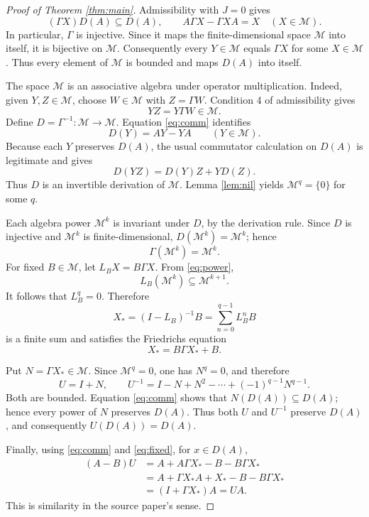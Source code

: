 \documentclass[11pt]{article}
\begin{document}
\begin{proof}[Proof of Theorem \ref{thm:main}]
Admissibility with \(J=0\) gives
\begin{equation}\label{eq:comm}
  (\Gamma X)D(A)\subseteq D(A),
  \qquad
  A\Gamma X-\Gamma XA=X
  \quad(X\in\mathcal M).
\end{equation}
In particular, \(\Gamma\) is injective.  Since it maps the finite-dimensional
space \(\mathcal M\) into itself, it is bijective on \(\mathcal M\).
Consequently every \(Y\in\mathcal M\) equals \(\Gamma X\) for some
\(X\in\mathcal M\).  Thus every element of \(\mathcal M\) is bounded and
maps \(D(A)\) into itself.

The space \(\mathcal M\) is an associative algebra under operator
multiplication.  Indeed, given \(Y,Z\in\mathcal M\), choose
\(W\in\mathcal M\) with \(Z=\Gamma W\).  Condition 4 of admissibility gives
\[
  YZ=Y\Gamma W\in\mathcal M.
\]
Define \(D=\Gamma^{-1}:\mathcal M\to\mathcal M\).  Equation
\eqref{eq:comm} identifies
\[
  D(Y)=AY-YA
  \qquad(Y\in\mathcal M).
\]
Because each \(Y\) preserves \(D(A)\), the usual commutator calculation on
\(D(A)\) is legitimate and gives
\[
  D(YZ)=D(Y)Z+YD(Z).
\]
Thus \(D\) is an invertible derivation of \(\mathcal M\).  Lemma
\ref{lem:nil} yields \(\mathcal M^q=\{0\}\) for some \(q\).

Each algebra power \(\mathcal M^k\) is invariant under \(D\), by the
derivation rule.  Since \(D\) is injective and \(\mathcal M^k\) is
finite-dimensional, \(D(\mathcal M^k)=\mathcal M^k\); hence
\begin{equation}\label{eq:power}
  \Gamma(\mathcal M^k)=\mathcal M^k.
\end{equation}
For fixed \(B\in\mathcal M\), let \(L_BX=B\Gamma X\).  From
\eqref{eq:power},
\[
  L_B(\mathcal M^k)\subseteq\mathcal M^{k+1}.
\]
It follows that \(L_B^q=0\).  Therefore
\[
  X_*=(I-L_B)^{-1}B=\sum_{n=0}^{q-1}L_B^nB
\]
is a finite sum and satisfies the Friedrichs equation
\begin{equation}\label{eq:fixed}
  X_*=B\Gamma X_*+B.
\end{equation}

Put \(N=\Gamma X_*\in\mathcal M\).  Since \(\mathcal M^q=0\), one has
\(N^q=0\), and therefore
\[
  U=I+N,
  \qquad
  U^{-1}=I-N+N^2-\cdots+(-1)^{q-1}N^{q-1}.
\]
Both are bounded.  Equation \eqref{eq:comm} shows that \(N(D(A))\subseteq
D(A)\); hence every power of \(N\) preserves \(D(A)\).  Thus both \(U\)
and \(U^{-1}\) preserve \(D(A)\), and consequently \(U(D(A))=D(A)\).

Finally, using \eqref{eq:comm} and \eqref{eq:fixed}, for \(x\in D(A)\),
\begin{align*}
  (A-B)U
   &=A+A\Gamma X_*-B-B\Gamma X_*\\
   &=A+\Gamma X_*A+X_*-B-B\Gamma X_*\\
   &=(I+\Gamma X_*)A=UA.
\end{align*}
This is similarity in the source paper's sense.
\end{proof}
\end{document}
